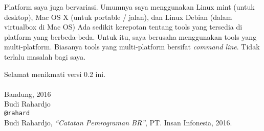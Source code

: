 Platform saya juga bervariasi. Umumnya saya menggunakan
Linux mint (untuk desktop), Mac OS X (untuk portable / jalan), dan
Linux Debian (dalam virtualbox di Mac OS)
Ada sedikit kerepotan tentang tools yang tersedia di platform
yang berbeda-beda.
Untuk itu, saya berusaha menggunakan tools yang multi-platform.
Biasanya tools yang multi-platform bersifat {\em command line}.
Tidak terlalu masalah bagi saya.

Selamat menikmati versi 0.2 ini.\\
\\
Bandung, 2016\\
Budi Rahardjo\\
\texttt{@rahard}\\
Budi Rahardjo, {\em ``Catatan Pemrograman BR''}, PT. Insan Infonesia, 2016.

